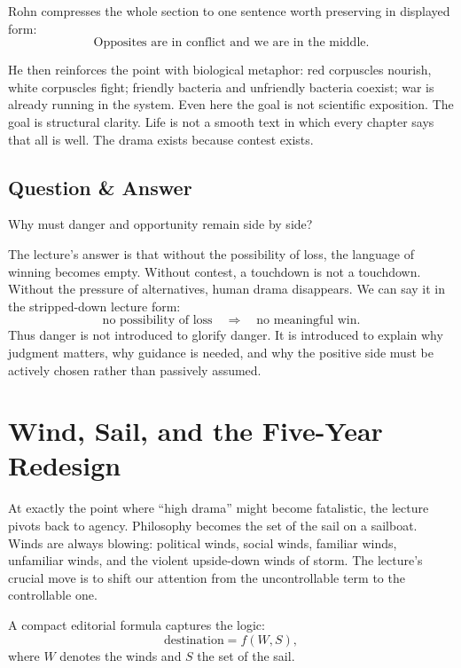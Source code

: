 Rohn compresses the whole section to one sentence worth preserving in displayed form:
\begin{equation}
\text{Opposites are in conflict and we are in the middle.}
\end{equation}

He then reinforces the point with biological metaphor: red corpuscles nourish, white corpuscles fight; friendly bacteria and unfriendly bacteria coexist; war is already running in the system. Even here the goal is not scientific exposition. The goal is structural clarity. Life is not a smooth text in which every chapter says that all is well. The drama exists because contest exists.

\subsection{Question \& Answer}

Why must danger and opportunity remain side by side?

The lecture's answer is that without the possibility of loss, the language of winning becomes empty. Without contest, a touchdown is not a touchdown. Without the pressure of alternatives, human drama disappears. We can say it in the stripped-down lecture form:
\begin{equation}
\text{no possibility of loss} \quad \Rightarrow \quad \text{no meaningful win}.
\end{equation}
Thus danger is not introduced to glorify danger. It is introduced to explain why judgment matters, why guidance is needed, and why the positive side must be actively chosen rather than passively assumed.

\section{Wind, Sail, and the Five-Year Redesign}

At exactly the point where ``high drama'' might become fatalistic, the lecture pivots back to agency. Philosophy becomes the set of the sail on a sailboat. Winds are always blowing: political winds, social winds, familiar winds, unfamiliar winds, and the violent upside-down winds of storm. The lecture's crucial move is to shift our attention from the uncontrollable term to the controllable one.

A compact editorial formula captures the logic:
\begin{equation}
\text{destination}=f(W,S),
\end{equation}
where \(W\) denotes the winds and \(S\) the set of the sail.

